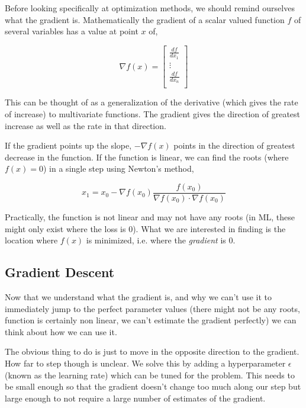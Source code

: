 \documentclass{article}
\begin{document}
Before looking specifically at optimization methods, we should remind ourselves what the gradient is. Mathematically the gradient of a scalar valued function $f$ of several variables has a value at point $x$ of,

\begin{equation}
    \nabla f(x) = \begin{bmatrix}
        \frac{df}{dx_{1}} \\
        \vdots \\
        \frac{df}{dx_{n}} \\
    \end{bmatrix}
\end{equation}

\noindent
This can be thought of as a generalization of the derivative (which gives the rate of increase) to multivariate functions. The gradient gives the direction of greatest increase as well as the rate in that direction.

If the gradient points up the slope, $-\nabla f(x)$ points in the direction of greatest decrease in the function. If the function is linear, we can find the roots (where $f(x) = 0$) in a single step using Newton's method,

\begin{equation}
    x_1 = x_0 - \nabla f(x_0) \frac{f(x_0)}{\nabla f(x_0)  \cdot \nabla f(x_0)}
\end{equation}

\noindent
Practically, the function is not linear and may not have any roots (in ML, these might only exist where the loss is 0). What we are interested in finding is the location where $f(x)$ is minimized, i.e. where the {\em gradient\/} is 0.

\subsection{Gradient Descent}

Now that we understand what the gradient is, and why we can't use it to immediately jump to the perfect parameter values (there might not be any roots, function is certainly non linear, we can't estimate the gradient perfectly) we can think about how we can use it.

The obvious thing to do is just to move in the opposite direction to the gradient. How far to step though is unclear. We solve this by adding a hyperparameter $\epsilon$ (known as the learning rate) which can be tuned for the problem. This needs to be small enough so that the gradient doesn't change too much along our step but large enough to not require a large number of estimates of the gradient.
\end{document}
